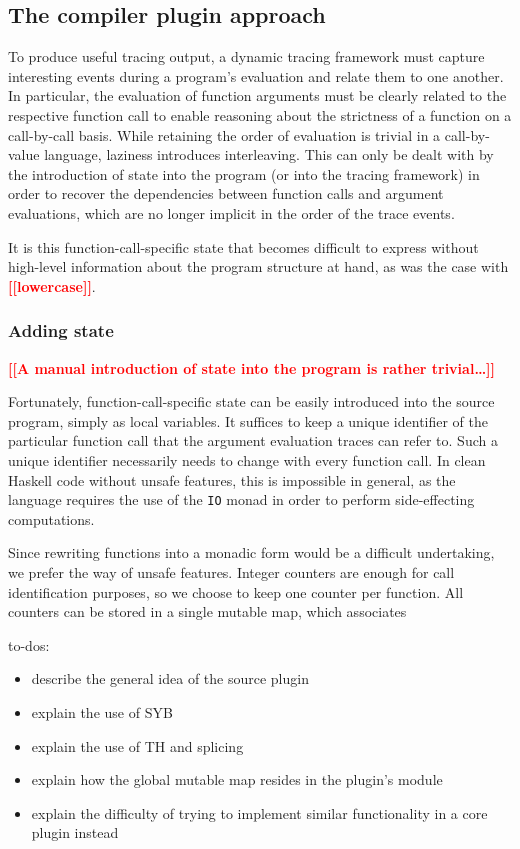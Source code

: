 \documentclass[thesis=B,english]{FITthesis}[2019/12/23]
\newcommand{\todo}[1]{\textcolor{red}{\textbf{[[#1]]}}}
\newcommand{\hsType}[1]{\texttt{#1}}
\begin{document}
\subsection{The compiler plugin approach}
To produce useful tracing output, a dynamic tracing framework must capture
interesting events during a program's evaluation and relate them to one
another. In particular, the evaluation of function arguments must be clearly
related to the respective function call to enable reasoning about the
strictness of a function on a call-by-call basis. While retaining the order of
evaluation is trivial in a call-by-value language, laziness introduces
interleaving. This can only be dealt with by the introduction of state into the
program (or into the tracing framework) in order to recover the dependencies
between function calls and argument evaluations, which are no longer implicit
in the order of the trace events.

It is this function-call-specific state that becomes difficult to express
without high-level information about the program structure at hand, as was the
case with \todo{lowercase}.

\subsubsection*{Adding state}
\todo{A manual introduction of state into the program is rather trivial\ldots}

Fortunately, function-call-specific state can be easily introduced into the
source program, simply as local variables. It suffices to keep a unique
identifier of the particular function call that the argument evaluation traces
can refer to. Such a unique identifier necessarily needs to change with every
function call. In clean Haskell code without unsafe features, this is
impossible in general, as the language requires the use of the \hsType{IO}
monad in order to perform side-effecting computations.

Since rewriting functions into a monadic form would be a difficult undertaking,
we prefer the way of unsafe features. Integer counters are enough for call
identification purposes, so we choose to keep one counter per function. All
counters can be stored in a single mutable map, which associates

to-dos:
\begin{itemize}
	\item describe the general idea of the source plugin
	\item explain the use of SYB
	\item explain the use of TH and splicing
	\item explain how the global mutable map resides in the plugin's module
	\item explain the difficulty of trying to implement similar functionality
		in a core plugin instead
\end{itemize}
\end{document}
